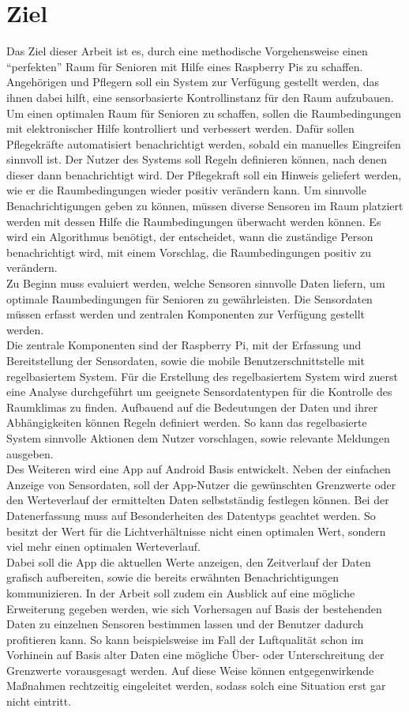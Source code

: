 \section{Ziel}
Das Ziel dieser Arbeit ist es, durch eine methodische Vorgehensweise einen ``perfekten'' Raum für Senioren mit Hilfe eines Raspberry Pis zu schaffen. Angehörigen und Pflegern soll ein System zur Verfügung gestellt werden, das ihnen dabei hilft, eine sensorbasierte Kontrollinstanz für den Raum aufzubauen.\\
Um einen optimalen Raum für Senioren zu schaffen, sollen die Raumbedingungen mit elektronischer Hilfe kontrolliert und verbessert werden.
Dafür sollen Pflegekräfte automatisiert benachrichtigt werden, sobald ein manuelles Eingreifen sinnvoll ist. Der Nutzer des Systems soll Regeln definieren können, nach denen dieser dann benachrichtigt wird. Der Pflegekraft soll ein Hinweis geliefert werden, wie er die Raumbedingungen wieder positiv verändern kann.
Um sinnvolle Benachrichtigungen geben zu können, müssen diverse Sensoren im Raum platziert werden mit dessen Hilfe die Raumbedingungen überwacht werden können. Es wird ein Algorithmus benötigt, der entscheidet, wann die zuständige Person benachrichtigt wird, mit einem Vorschlag, die Raumbedingungen positiv zu verändern.\\
Zu Beginn muss evaluiert werden, welche Sensoren sinnvolle Daten liefern, um optimale Raumbedingungen für Senioren zu gewährleisten. Die Sensordaten müssen erfasst werden und zentralen Komponenten zur Verfügung gestellt werden.\\
Die zentrale Komponenten sind der Raspberry Pi, mit der Erfassung und Bereitstellung der Sensordaten, sowie die mobile Benutzerschnittstelle mit regelbasiertem System.
Für die Erstellung des regelbasiertem System wird zuerst eine Analyse durchgeführt um geeignete Sensordatentypen für die Kontrolle des Raumklimas zu finden. Aufbauend auf die Bedeutungen der Daten und ihrer Abhängigkeiten können Regeln definiert werden. So kann das regelbasierte System sinnvolle Aktionen dem Nutzer vorschlagen, sowie relevante Meldungen ausgeben.\\
Des Weiteren wird eine App auf Android Basis entwickelt. Neben der einfachen Anzeige von Sensordaten, soll der App-Nutzer die gewünschten Grenzwerte oder den Werteverlauf der ermittelten Daten selbstständig festlegen können. Bei der Datenerfassung muss auf Besonderheiten des Datentyps geachtet werden. So besitzt der Wert für die Lichtverhältnisse nicht einen optimalen Wert, sondern viel mehr einen optimalen Werteverlauf.\\
Dabei soll die App die aktuellen Werte anzeigen, den Zeitverlauf der Daten grafisch aufbereiten, sowie die bereits erwähnten Benachrichtigungen kommunizieren.
In der Arbeit soll zudem ein Ausblick auf eine mögliche Erweiterung gegeben werden, wie sich Vorhersagen auf Basis der bestehenden Daten zu einzelnen Sensoren bestimmen lassen und der Benutzer dadurch profitieren kann. So kann beispielsweise im Fall der Luftqualität schon im Vorhinein auf Basis alter Daten eine mögliche Über- oder Unterschreitung der Grenzwerte vorausgesagt werden. Auf diese Weise können entgegenwirkende Maßnahmen rechtzeitig eingeleitet werden, sodass solch eine Situation erst gar nicht eintritt. 
